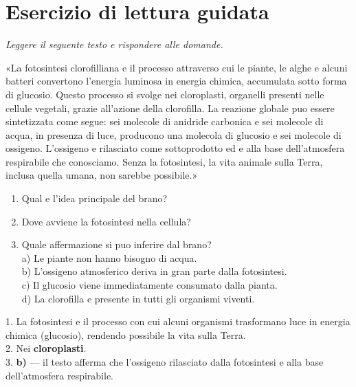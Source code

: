\documentclass[12pt, a4paper, twoside, openright]{book}
\theoremstyle{definition}
\begin{document}
\section{Esercizio di lettura guidata}

\begin{esercizio}
\textit{Leggere il seguente testo e rispondere alle domande.}

\medskip
«La fotosintesi clorofilliana e il processo attraverso cui le piante, le alghe e alcuni batteri convertono l'energia luminosa in energia chimica, accumulata sotto forma di glucosio. Questo processo si svolge nei cloroplasti, organelli presenti nelle cellule vegetali, grazie all'azione della clorofilla. La reazione globale puo essere sintetizzata come segue: sei molecole di anidride carbonica e sei molecole di acqua, in presenza di luce, producono una molecola di glucosio e sei molecole di ossigeno. L'ossigeno e rilasciato come sottoprodotto ed e alla base dell'atmosfera respirabile che conosciamo. Senza la fotosintesi, la vita animale sulla Terra, inclusa quella umana, non sarebbe possibile.»

\medskip
\begin{enumerate}[label=\arabic*.]
  \item Qual e l'idea principale del brano?
  \item Dove avviene la fotosintesi nella cellula?
  \item Quale affermazione si puo inferire dal brano?\\
        a) Le piante non hanno bisogno di acqua.\\
        b) L'ossigeno atmosferico deriva in gran parte dalla fotosintesi.\\
        c) Il glucosio viene immediatamente consumato dalla pianta.\\
        d) La clorofilla e presente in tutti gli organismi viventi.
\end{enumerate}
\end{esercizio}
\begin{soluzione}
1. La fotosintesi e il processo con cui alcuni organismi trasformano luce in energia chimica (glucosio), rendendo possibile la vita sulla Terra.\\
2. Nei \textbf{cloroplasti}.\\
3. \textbf{b)} --- il testo afferma che l'ossigeno rilasciato dalla fotosintesi e alla base dell'atmosfera respirabile.
\end{soluzione}
\end{document}
